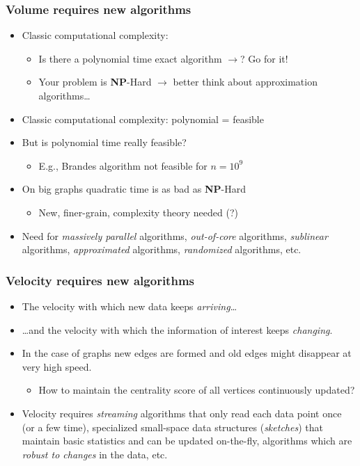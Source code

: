 \begin{frame}
  \frametitle{Volume requires new algorithms}
  \pause
  \begin{itemize}
    \item  Classic computational complexity:
    \begin{itemize}
      \item Is there a  polynomial time exact algorithm $\mathbf{\rightarrow}$?
        Go for it!
      \item Your problem is \textbf{NP}-Hard $\mathbf{\rightarrow}$ better think
        about approximation algorithms\ldots
    \end{itemize}
  \item Classic computational complexity: polynomial = feasible
  \pause
  \item But is polynomial time really feasible?
    \begin{itemize}
      \item E.g., Brandes algorithm not feasible for $n = 10^9$
    \end{itemize}
  \pause
  \item On big graphs quadratic time is as bad as \textbf{NP}-Hard
  \begin{itemize}
    \item New, finer-grain, complexity theory needed (?)
  \end{itemize}
  \pause
  \item Need for \emph{massively parallel} algorithms, \emph{out-of-core}
    algorithms, \emph{sublinear} algorithms, \emph{approximated} algorithms,
    \emph{randomized} algorithms, etc.
  \end{itemize}
\end{frame}

\begin{frame}
  \frametitle{Velocity requires new algorithms}
  \pause
  \begin{itemize}
    \item  The velocity with which new data keeps \emph{arriving}\ldots
    \pause
    \item \ldots and the velocity with which the information of interest keeps
      \emph{changing}.
    \vfill
    \item In the case of graphs new edges are formed and old edges might
      disappear at very high speed.
    \pause
    \begin{itemize}
      \item How to maintain the centrality score of all vertices continuously
        updated?
    \end{itemize}
    \vfill
    \pause
    \item Velocity requires \emph{streaming} algorithms that only read each data
    point once (or a few time), specialized small-space data structures
    (\emph{sketches}) that maintain basic statistics and can be updated
      on-the-fly, algorithms which are \emph{robust to changes} in the data, etc.
  \end{itemize}
\end{frame}

